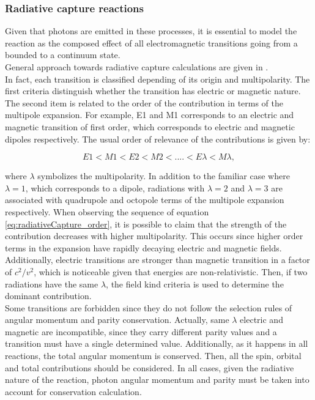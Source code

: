 \documentclass[openany]{book}
\begin{document}
\subsubsection{Radiative capture reactions}   \label{ssub:potential_calculations_radiativeCapture}

Given that photons are emitted in these processes, it is essential to model the reaction as the composed effect of  all electromagnetic transitions going from a bounded to a continuum state.  \\

General approach towards radiative capture calculations are given in \cite{goldhaber_weneser_1955}.\\

In fact, each transition is classified depending of its origin and multipolarity. The first criteria distinguish whether the transition has electric or magnetic nature. The second item is related to the order of the contribution in terms of the multipole expansion. For example, E1 and M1 corresponds to an electric and magnetic transition of first order, which corresponds to electric and magnetic dipoles respectively. The usual order of relevance of the contributions is given by: 

\begin{equation}  \label{eq:radiativeCapture_order}
	E1 < M1 < E2 < M2 < .... < E\lambda < M\lambda,
\end{equation}

where $\lambda$ symbolizes the multipolarity. In addition to the familiar case where $\lambda = 1$, which corresponds to a dipole, radiations with $\lambda = 2$ and $\lambda = 3$ are associated with quadrupole and octopole terms of the multipole expansion respectively. When observing the sequence of equation \ref{eq:radiativeCapture_order}, it is possible to claim that the strength of the contribution decreases with higher multipolarity. This occurs since higher order terms in the expansion have rapidly decaying electric and magnetic fields. Additionally, electric transitions are stronger than magnetic transition in a factor of $c^2/v^2$, which is noticeable given that energies are non-relativistic. Then, if two radiations have the same $\lambda$, the field kind criteria is used to determine the dominant contribution. \\

Some transitions are forbidden since they do not follow the selection rules of angular momentum and parity conservation. Actually, same $\lambda$ electric and magnetic are incompatible, since they carry different parity values and a transition must have a single determined value. Additionally, as it happens in all reactions, the total angular momentum is conserved. Then, all the spin, orbital and total  contributions should be considered. In all cases, given the radiative nature of the reaction, photon angular momentum and parity must be taken into account for conservation calculation. \\
\end{document}
